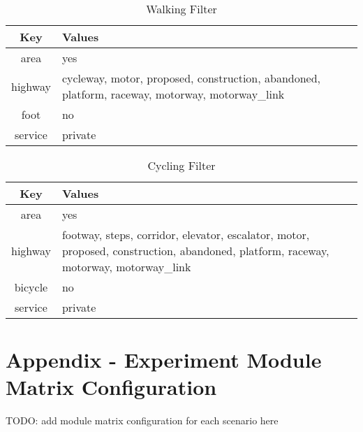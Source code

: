 \begin{table}[h]
\centering
\caption{Walking Filter}
\begin{tabular}{|c|p{10cm}|}
\hline
\textbf{Key}         & \textbf{Values}                                                                                                             \\ \hline
area                 & yes                                                                                                                         \\ \hline
highway              & cycleway, motor, proposed, construction, abandoned, platform, raceway, motorway, motorway\_link                             \\ \hline
foot                 & no                                                                                                                          \\ \hline
service              & private                                                                                                                     \\ \hline
\end{tabular}
\end{table}


\begin{table}[h]
\centering
\caption{Cycling Filter}
\begin{tabular}{|c|p{10cm}|}
\hline
\textbf{Key}         & \textbf{Values}                                                                                                             \\ \hline
area                 & yes                                                                                                                         \\ \hline
highway              & footway, steps, corridor, elevator, escalator, motor, proposed, construction, abandoned, platform, raceway, motorway, motorway\_link \\ \hline
bicycle              & no                                                                                                                          \\ \hline
service              & private                                                                                                                     \\ \hline
\end{tabular}
\end{table}

\section{Appendix - Experiment Module Matrix Configuration}
\label{app:experiment_module_matrix_configuration}

TODO: add module matrix configuration for each scenario here
